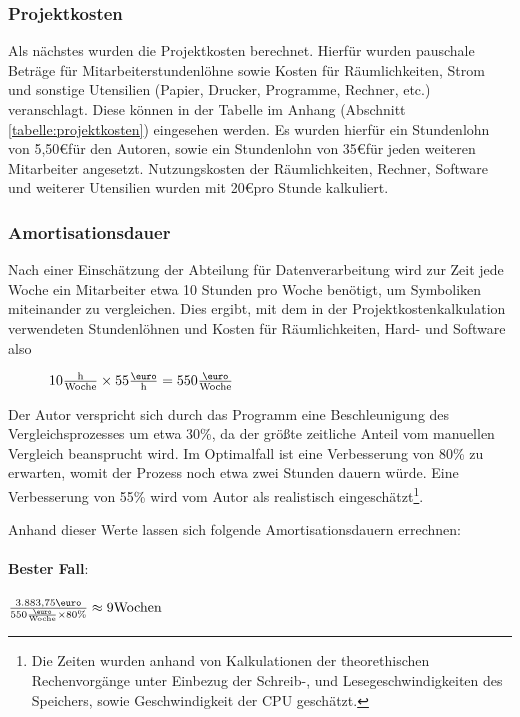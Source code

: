 \subsubsection{Projektkosten}
Als nächstes wurden die Projektkosten berechnet. Hierfür wurden pauschale Beträge 
für Mitarbeiterstundenlöhne sowie Kosten für Räumlichkeiten, Strom und sonstige Utensilien 
(Papier, Drucker, Programme, Rechner, etc.) veranschlagt. Diese können in der Tabelle im
Anhang (Abschnitt \ref{tabelle:projektkosten}) eingesehen werden. Es wurden hierfür
ein Stundenlohn von 5,50\euro für den Autoren, sowie ein Stundenlohn von 35\euro  für jeden
weiteren Mitarbeiter angesetzt. Nutzungskosten der Räumlichkeiten, Rechner, Software
und weiterer Utensilien wurden mit 20\euro  pro Stunde kalkuliert. \par


\subsubsection{Amortisationsdauer}
Nach einer Einschätzung der Abteilung für Datenverarbeitung wird zur Zeit jede Woche ein Mitarbeiter etwa 10 Stunden pro Woche benötigt, um Symboliken miteinander zu vergleichen. Dies ergibt, mit dem in der Projektkostenkalkulation verwendeten
Stundenlöhnen und Kosten für Räumlichkeiten, Hard- und Software also 
\begin{figure}[!htp]
 $10\frac{\text{h}}{\text{Woche}} \times 55\frac{\text{\euro}}{\text{h}} = 550\frac{\text{\euro}}{\text{Woche}}$
\end{figure}

Der Autor verspricht sich durch das Programm eine Beschleunigung des Vergleichsprozesses um etwa 30\%, da der größte zeitliche Anteil vom manuellen Vergleich beansprucht wird. Im Optimalfall ist eine Verbesserung von 80\% zu erwarten, womit der Prozess noch etwa zwei Stunden dauern würde. Eine Verbesserung von 55\% wird vom Autor als realistisch eingeschätzt\footnote{Die Zeiten wurden anhand von Kalkulationen der theorethischen Rechenvorgänge unter Einbezug der Schreib-, und Lesegeschwindigkeiten des Speichers, sowie Geschwindigkeit der CPU geschätzt.}.

Anhand dieser Werte lassen sich folgende Amortisationsdauern errechnen:\\
\\

\textbf{Bester Fall}: \\
\\
$\frac{3.883,75\text{\euro}}{550\frac{\text{\euro}}{\text{Woche}} \times 80\text{\%}} \approx 9 \text{Wochen}$
\\

